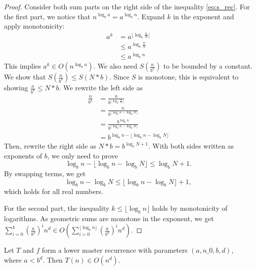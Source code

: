 \begin{proof}
    Consider both sum parts on the right side of the inequality \ref{eq:s_rec}.
    For the first part, we notice that $n^{\log_b{a}} = a^{\log_b{n}}$.
    Expand $k$ in the exponent and apply monotonicity:
    \begin{align*}
        a^k &= a^{\lfloor \log_b{\frac{n}{N}} \rfloor} \\
            &\leq a^{\log_b{\frac{n}{N}}} \\
            &\leq a^{\log_b{n}}
    \end{align*}
    This implies $a^k \in O(n^{\log_b{a}})$. We also need $S(\frac{n}{b^k})$ to
    be bounded by a constant. We show that $S(\frac{n}{b^k}) \leq S(N*b)$.
    Since $S$ is monotone, this is equivalent to showing 
    $\frac{n}{b^k} \leq N*b$. We rewrite the left side as
    \begin{align*}
        \frac{n}{b^k} &= \frac{n}{b^{\lfloor \log_b{\frac{n}{N}} \rfloor}} \\
                      &= \frac{n}{b^{\lfloor \log_b{n} - \log_b{N} \rfloor}} \\
                      &= \frac{b^{\log_b{n}}}
                              {b^{\lfloor \log_b{n} - \log_b{N} \rfloor}} \\
                      &= b^{\log_b{n} - 
                            \lfloor \log_b{n} - \log_b{N} \rfloor}
    \end{align*}
    Then, rewrite the right side as $N*b = b^{\log_b{N} + 1}$. With both 
    sides written as exponents of $b$, we only need to prove
    \[\log_b{n} - \lfloor \log_b{n} - \log_b{N} \rfloor \leq \log_b{N} + 1.\]
    By swapping terms, we get
    \[\log_b{n} - \log_b{N} \leq \lfloor \log_b{n} - \log_b{N} \rfloor + 1,\]
    which holds for all real numbers. 

    For the second part, the inequality $k \leq \lfloor \log_b{n} \rfloor$ 
    holds by monotonicity of logarithms. As geometric sums are monotone in 
    the exponent, we get $\sum_{i=0}^k (\frac{a}{b^d})^i n^d \in 
    O(\sum_{i=0}^{\lfloor \log_b{n} \rfloor} (\frac{a}{b^d})^i n^d)$.
\end{proof}

\begin{theorem}
    \label{thm:lower_master_rec_big_o_of_lt}
    \leanok
    Let $T$ and $f$ form a lower master recurrence with parameters 
    $(a, n\_0, b, d)$, where $a < b^d$. Then $T(n) \in O(n^d)$.
\end{theorem}

